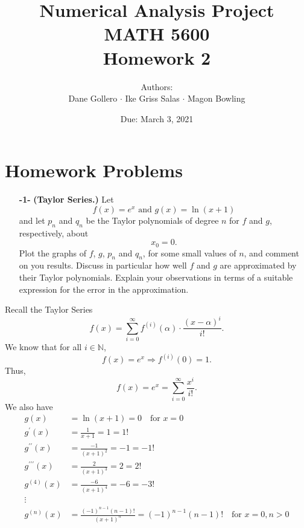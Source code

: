 \documentclass[11pt]{article}
\theoremstyle{definition}
\newcommand{\1}[1]{\mathbf{1} \left \{ #1 \right \}}
\begin{document}
\title{Numerical Analysis Project \\ MATH 5600 \\ Homework 2}
\date{Due: March 3, 2021}
\author{Authors: \\ Dane Gollero $\cdot$ Ike Griss Salas $\cdot$ Magon Bowling}

\maketitle

\tableofcontents

\section{Homework Problems}

\begin{itemize}
    \item[{\textbf{-1-}}] \textbf{(Taylor Series.)}  Let
    \begin{equation}
        f(x)=e^x \text{ and } g(x)=\ln(x+1)
    \end{equation}
    and let $p_n$ and $q_n$ be the Taylor polynomials of degree $n$ for $f$ and $g$, respectively, about
    \begin{equation}
        x_0 = 0.
    \end{equation}
    Plot the graphs of $f$, $g$, $p_n$ and $q_n$, for some small values of $n$, and comment on you results.  Discuss in particular how well $f$ and $g$ are approximated by their Taylor polynomials.  Explain your observations in terms of a suitable expression for the error in the approximation.
\end{itemize}
Recall the Taylor Series
\[f(x) = \sum_{i=0}^{\infty} f^{(i)} (\alpha) \cdot \frac{(x-\alpha)^i}{i!}.\]
We know that for all \(i \in \mathbb{N}\),
\[f(x) = e^x \Rightarrow f^{(i)}(0) = 1.\]
Thus,
\[f(x) = e^x = \sum_{i=0}^{\infty} \frac{x^i}{i!}.\]
We also have
\begin{equation*}
    \begin{split}
        g(x) &= \ln (x+1) = 0 \quad \text{for } x = 0 \\
        g^{\prime}(x) &= \frac{1}{x+1} = 1 = 1! \\
        g^{\prime\prime}(x) &= \frac{-1}{(x+1)^2} = -1 = -1! \\
        g^{\prime\prime\prime}(x) &= \frac{2}{(x+1)^3} = 2 = 2! \\
        g^{(4)}(x) &= \frac{-6}{(x+1)^4} = -6 = -3! \\
        \vdots \\
        g^{(n)} (x) &= \frac{(-1)^{n-1} (n-1)!}{(x+1)^n} = (-1)^{n-1} (n-1)! \quad \text{for } x=0, n>0
    \end{split}
\end{equation*}
\end{document}
